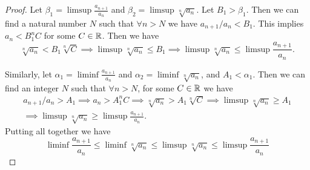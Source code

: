 \begin{proof}
	Let $\beta_1 = \limsup \frac{a_{n+1}}{a_n}$ and $\beta_2 = \limsup \sqrt[n]{a_n}$. Let $B_1 > \beta_1$. Then we can find a natural number $N$ such that $\forall n>N$ we have $a_{n+1}/a_n < B_1$. This implies $a_n < B_1^n C$ for some $C \in\mathbb{R}$. Then we have
	\[ \sqrt[n]{a_n} < B_1 \sqrt[n]{C} \implies \limsup \sqrt[n]{a_n} \leq B_1 \implies  \boxed{\limsup \sqrt[n]{a_n} \leq \limsup \frac{a_{n+1}}{a_n}}.  \]
	
	Similarly, let $\alpha_1 = \liminf \frac{a_{n+1}}{a_n}$ and $\alpha_2 = \liminf \sqrt[n]{a_n}$, and $A_1 < \alpha_1$. Then we can find an integer $N$ such that $\forall n>N$, for some $C \in \mathbb{R}$ we have
	\begin{align*}
		a_{n+1}/a_n > A_1 \implies a_n > A_1^n C \implies \sqrt[n]{a_n} > A_1 \sqrt[n]{C} \implies \limsup \sqrt[n]{a_n} \geq A_1 \\
		 \implies \boxed{\limsup \sqrt[n]{a_n} \geq \limsup \frac{a_{n+1}}{a_n}}. 
	\end{align*}
	 Putting all together we have
	 \[  \liminf \frac{a_{n+1}}{a_n} \leq \liminf \sqrt[n]{a_n} \leq \limsup \sqrt[n]{a_n} \leq \limsup \frac{a_{n+1}}{a_n} \]

\end{proof}

